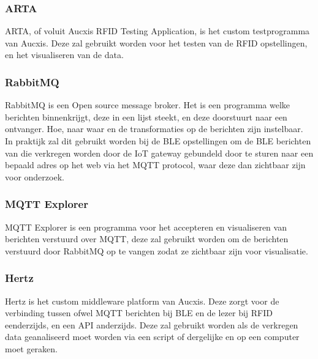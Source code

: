 \subsubsection{ARTA}
ARTA, of voluit Aucxis RFID Testing Application, is het custom testprogramma van Aucxis. Deze zal gebruikt worden voor het testen van de RFID opstellingen, en het visualiseren van de data.

\subsubsection{RabbitMQ}
RabbitMQ is een Open source message broker. Het is een programma welke berichten binnenkrijgt, deze in een lijst steekt, en deze doorstuurt naar een ontvanger. Hoe, naar waar en de transformaties op de berichten zijn instelbaar. In praktijk zal dit gebruikt worden bij de BLE opstellingen om de BLE berichten van die verkregen worden door de IoT gateway gebundeld door te sturen naar een bepaald adres op het web via het MQTT protocol, waar deze dan zichtbaar zijn voor onderzoek.\autocite{RabbitMQ2022}

\subsubsection{MQTT Explorer}
MQTT Explorer is een programma voor het accepteren en visualiseren van berichten verstuurd over MQTT, deze zal gebruikt worden om de berichten verstuurd door RabbitMQ op te vangen zodat ze zichtbaar zijn voor visualisatie.\autocite{Nordquist2019}

\subsubsection{Hertz}
Hertz is het custom middleware platform van Aucxis. Deze zorgt voor de verbinding tussen ofwel MQTT berichten bij BLE en de lezer bij RFID eenderzijds, en een API anderzijds. Deze zal gebruikt worden als de verkregen data geanaliseerd moet worden via een script of dergelijke en op een computer moet geraken.\autocite{Hertz2020}